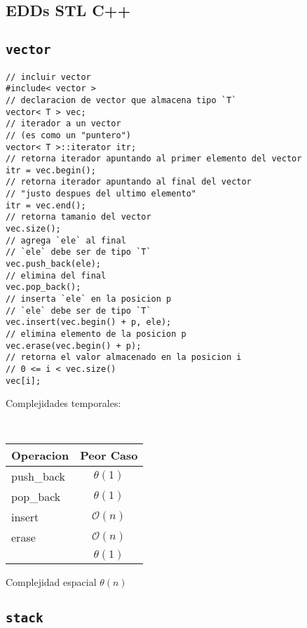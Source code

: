 \documentclass{article}
\newcommand{\bigO}{\mathcal{O}}
\begin{document}
\begin{multicols}{2}
\section*{\small EDDs STL C++}

\subsection*{\texttt{\footnotesize vector}}

\begin{lstlisting}
// incluir vector
#include< vector > 
// declaracion de vector que almacena tipo `T`
vector< T > vec; 
// iterador a un vector
// (es como un "puntero")
vector< T >::iterator itr; 
// retorna iterador apuntando al primer elemento del vector
itr = vec.begin();
// retorna iterador apuntando al final del vector
// "justo despues del ultimo elemento"
itr = vec.end();
// retorna tamanio del vector
vec.size();
// agrega `ele` al final
// `ele` debe ser de tipo `T`
vec.push_back(ele); 
// elimina del final
vec.pop_back();
// inserta `ele` en la posicion p
// `ele` debe ser de tipo `T`
vec.insert(vec.begin() + p, ele); 
// elimina elemento de la posicion p
vec.erase(vec.begin() + p);
// retorna el valor almacenado en la posicion i
// 0 <= i < vec.size()
vec[i]; 
\end{lstlisting}

Complejidades temporales:
\begin{table}[H]
  \tt \scriptsize
  \begin{center}
    \begin{tabular}[c]{l|c}
      \hline
      Operacion & Peor Caso \\
      \hline
      push\_back & $\theta(1)$ \\
      \hline
      pop\_back & $\theta(1)$ \\
      \hline
      insert & $\bigO(n)$ \\
      \hline
      erase & $\bigO(n)$ \\
      \hline
      [i] & $\theta(1)$\\
      \hline
    \end{tabular}
  \end{center}
\end{table}

Complejidad espacial $\theta(n)$

\subsection*{\tt \footnotesize stack}


\end{multicols}
\end{document}
